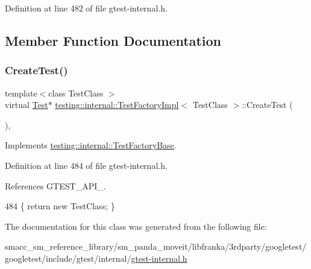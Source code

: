 Definition at line 482 of file gtest-\/internal.\+h.



\subsection{Member Function Documentation}
\mbox{\label{classtesting_1_1internal_1_1TestFactoryImpl_a8860c89bdb06450a5d5e8137ebd9d775}} 
\subsubsection{\texorpdfstring{Create\+Test()}{CreateTest()}}
{\footnotesize\ttfamily template$<$class Test\+Class $>$ \\
virtual \hyperlink{classtesting_1_1Test}{Test}$\ast$ \hyperlink{classtesting_1_1internal_1_1TestFactoryImpl}{testing\+::internal\+::\+Test\+Factory\+Impl}$<$ Test\+Class $>$\+::Create\+Test (\begin{DoxyParamCaption}{ }\end{DoxyParamCaption})\hspace{0.3cm}{\ttfamily [inline]}, {\ttfamily [virtual]}}



Implements \hyperlink{classtesting_1_1internal_1_1TestFactoryBase_a07ac3ca0b196cdb092da0bb186b7c030}{testing\+::internal\+::\+Test\+Factory\+Base}.



Definition at line 484 of file gtest-\/internal.\+h.



References G\+T\+E\+S\+T\+\_\+\+A\+P\+I\+\_\+.


\begin{DoxyCode}
484 \{ \textcolor{keywordflow}{return} \textcolor{keyword}{new} TestClass; \}
\end{DoxyCode}


The documentation for this class was generated from the following file\+:\begin{DoxyCompactItemize}
\item 
smacc\+\_\+sm\+\_\+reference\+\_\+library/sm\+\_\+panda\+\_\+moveit/libfranka/3rdparty/googletest/googletest/include/gtest/internal/\hyperlink{gtest-internal_8h}{gtest-\/internal.\+h}\end{DoxyCompactItemize}
